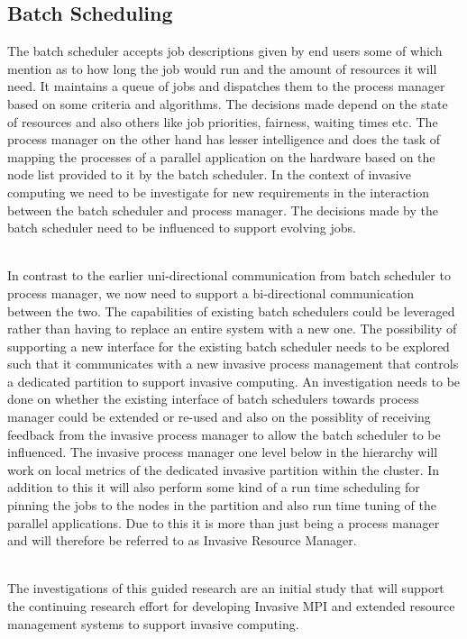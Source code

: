 \documentclass[a4paper, 12pt]{article}
\begin{document}
\subsection{Batch Scheduling}
The batch scheduler accepts job descriptions given by end users some of which mention as to how long the job would run and the amount of resources it will need. It maintains a queue of jobs and dispatches them to the process manager based on some criteria and algorithms. The decisions made depend on the state of resources and also others like job priorities, fairness, waiting times etc. The process manager on the other hand has lesser intelligence and does the task of mapping the processes of a parallel application on the hardware based on the node list provided to it by the batch scheduler. In the context of invasive computing we need to be investigate for new requirements in the interaction between the batch scheduler and process manager. The decisions made by the batch scheduler need to be influenced to support evolving jobs.\par
\noindent
\\In contrast to the earlier uni-directional communication from batch scheduler to process manager, we now need to support a bi-directional communication between the two. The capabilities of existing batch schedulers could be leveraged rather than having to replace an entire system with a new one. The possibility of supporting a new interface for the existing batch scheduler needs to be explored such that it communicates with a new invasive process management that controls a dedicated partition to support invasive computing. An investigation needs to be done on whether the existing interface of batch schedulers towards process manager could be extended or re-used and also on the possiblity of receiving feedback from the invasive process manager to allow the batch scheduler to be influenced. The invasive process manager one level below in the hierarchy will work on local metrics of the dedicated invasive partition within the cluster. In addition to this it will also perform some kind of a run time scheduling for pinning the jobs to the nodes in the partition and also run time tuning of the parallel applications. Due to this it is more than just being a process manager and will therefore be referred to as Invasive Resource Manager.\par
\noindent
\\The investigations of this guided research are an initial study that will support the continuing research effort for developing Invasive MPI and extended resource management systems to support invasive computing.
\end{document}
